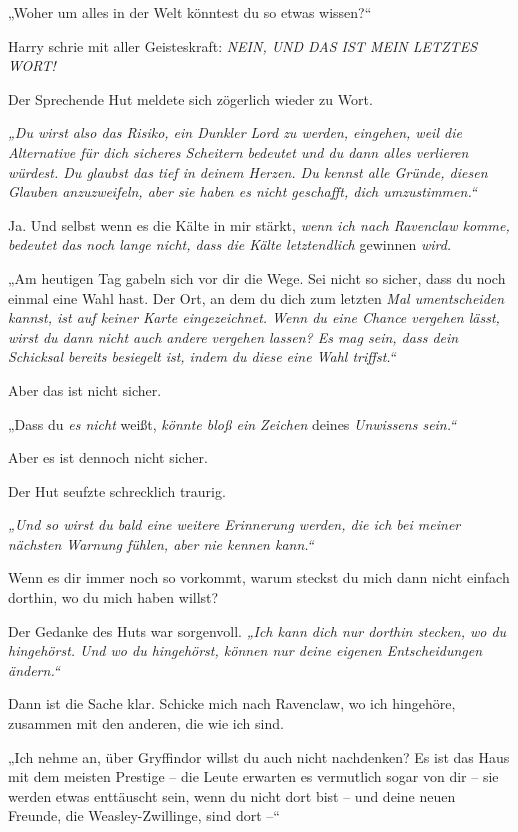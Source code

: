 {„Woher um alles in der Welt könntest du so etwas wissen?“

Harry schrie mit aller Geisteskraft: \emph{NEIN, UND DAS IST MEIN LETZTES WORT!}

Der Sprechende Hut meldete sich zögerlich wieder zu Wort.

\emph{„Du wirst also das Risiko, ein Dunkler Lord zu werden, eingehen, weil die Alternative für dich sicheres Scheitern bedeutet und du dann alles verlieren würdest. Du glaubst das tief in deinem Herzen. Du kennst alle Gründe, diesen Glauben anzuzweifeln, aber sie haben es nicht geschafft, dich umzustimmen.“}

Ja. Und selbst wenn es die Kälte in mir stärkt, \emph{wenn ich nach Ravenclaw komme, bedeutet das noch lange nicht, dass die Kälte letztendlich} gewinnen \emph{wird.}

„Am heutigen Tag gabeln sich vor dir die Wege. Sei nicht so sicher, dass du noch einmal eine Wahl hast. Der Ort, an dem du dich zum letzten \emph{Mal umentscheiden kannst, ist auf keiner Karte eingezeichnet. Wenn du eine Chance vergehen lässt, wirst du dann nicht auch andere vergehen lassen? Es mag sein, dass dein Schicksal bereits besiegelt ist, indem du diese eine Wahl triffst.“}

Aber das ist nicht sicher.

„Dass du \emph{es nicht} weißt, \emph{könnte bloß ein Zeichen} deines \emph{Unwissens sein.“}

Aber es ist dennoch nicht sicher.

Der Hut seufzte schrecklich traurig.

\emph{„Und so wirst du bald eine weitere Erinnerung werden, die ich bei meiner nächsten Warnung fühlen, aber nie kennen kann.“}

Wenn es dir immer noch so vorkommt, warum steckst du mich dann nicht einfach dorthin, wo du mich haben willst?

Der Gedanke des Huts war sorgenvoll. \emph{„Ich kann dich nur dorthin stecken, wo du hingehörst. Und wo du hingehörst, können nur deine eigenen Entscheidungen ändern.“}

Dann ist die Sache klar. Schicke mich nach Ravenclaw, wo ich hingehöre, zusammen mit den anderen, die wie ich sind.

„Ich nehme an, über Gryffindor willst du auch nicht nachdenken? Es ist das Haus mit dem meisten Prestige -- die Leute erwarten es vermutlich sogar von dir -- sie werden etwas enttäuscht sein, wenn du nicht dort bist -- und deine neuen Freunde, die Weasley-Zwillinge, sind dort --“

}
